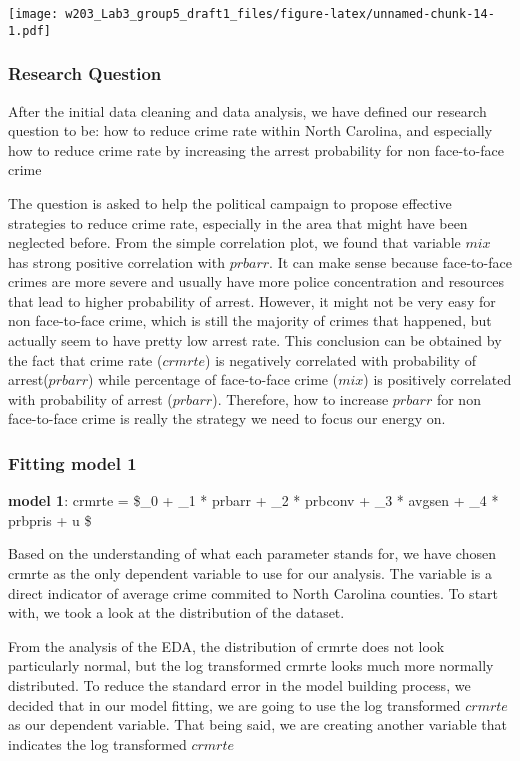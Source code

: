\documentclass[]{article}
\begin{document}
\texttt{[image: w203\_Lab3\_group5\_draft1\_files/figure-latex/unnamed-chunk-14-1.pdf]}

\subsubsection{Research Question}\label{research-question}

After the initial data cleaning and data analysis, we have defined our
research question to be: how to reduce crime rate within North Carolina,
and especially how to reduce crime rate by increasing the arrest
probability for non face-to-face crime

The question is asked to help the political campaign to propose
effective strategies to reduce crime rate, especially in the area that
might have been neglected before. From the simple correlation plot, we
found that variable \(mix\) has strong positive correlation with
\(prbarr\). It can make sense because face-to-face crimes are more
severe and usually have more police concentration and resources that
lead to higher probability of arrest. However, it might not be very easy
for non face-to-face crime, which is still the majority of crimes that
happened, but actually seem to have pretty low arrest rate. This
conclusion can be obtained by the fact that crime rate (\(crmrte\)) is
negatively correlated with probability of arrest(\(prbarr\)) while
percentage of face-to-face crime (\(mix\)) is positively correlated with
probability of arrest (\(prbarr\)). Therefore, how to increase
\(prbarr\) for non face-to-face crime is really the strategy we need to
focus our energy on.

\subsubsection{Fitting model 1}\label{fitting-model-1}

\textbf{model 1}: crmrte = \$\beta\_0 + \beta\_1 * prbarr + \beta\_2 *
prbconv + \beta\_3 * avgsen + \beta\_4 * prbpris + u \$

Based on the understanding of what each parameter stands for, we have
chosen crmrte as the only dependent variable to use for our analysis.
The variable is a direct indicator of average crime commited to North
Carolina counties. To start with, we took a look at the distribution of
the dataset.

From the analysis of the EDA, the distribution of crmrte does not look
particularly normal, but the log transformed crmrte looks much more
normally distributed. To reduce the standard error in the model building
process, we decided that in our model fitting, we are going to use the
log transformed \(crmrte\) as our dependent variable. That being said,
we are creating another variable that indicates the log transformed
\(crmrte\)
\end{document}
